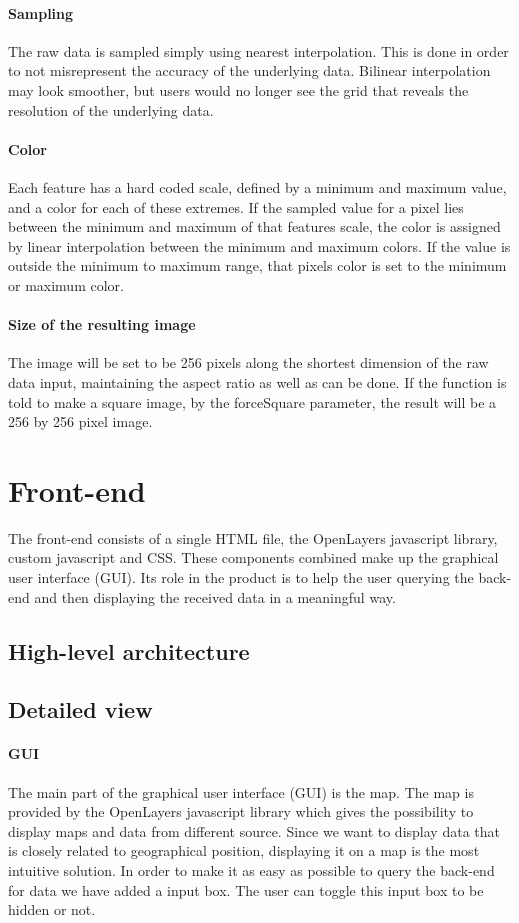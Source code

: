 \documentclass[11pt,a4paper,titlepage,oneside]{report}
\begin{document}
\paragraph{Sampling}
The raw data is sampled simply using nearest interpolation. This is done in order to not misrepresent the accuracy of the underlying data. Bilinear interpolation may look smoother, but users would no longer see the grid that reveals the resolution of the underlying data.
\paragraph{Color}
Each feature has a hard coded scale, defined by a minimum and maximum value, and a color for each of these extremes. If the sampled value for a pixel lies between the minimum and maximum of that features scale, the color is assigned by linear interpolation between the minimum and maximum colors. If the value is outside the minimum to maximum range, that pixels color is set to the minimum or maximum color.
\paragraph{Size of the resulting image}
The image will be set to be 256 pixels along the shortest dimension of the raw data input, maintaining the aspect ratio as well as can be done. If the function is told to make a square image, by the forceSquare parameter, the result will be a 256 by 256 pixel image.

\section{Front-end}
The front-end consists of a single \gls{HTML} file, the OpenLayers javascript library, custom javascript and \gls{CSS}. These components combined make up the graphical user interface (GUI). Its role in the product is to help the user querying the back-end and then displaying the received data in a meaningful way. 

\subsection{High-level architecture}

\subsection{Detailed view}
\paragraph{GUI}
The main part of the graphical user interface (GUI) is the map. The map is provided by the OpenLayers javascript library which gives the possibility to display maps and data from different source. Since we want to display data that is closely related to geographical position, displaying it on a map is the most intuitive solution. In order to make it as easy as possible to query the back-end for data we have added a input box. The user can toggle this input box to be hidden or not.
\end{document}
